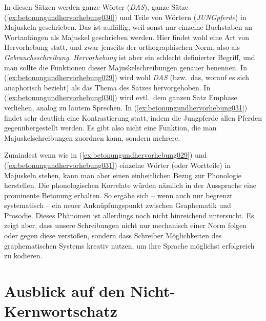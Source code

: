 In diesen Sätzen werden ganze Wörter (\textit{DAS}), ganze Sätze (\ref{ex:betonungundhervorhebung030}) und Teile von Wörtern (\textit{JUNGpferde}) in Majuskeln geschrieben.
Das ist auffällig, weil sonst nur einzelne Buchstaben an Wortanfängen als Majuskel geschrieben werden.
Hier findet wohl eine Art von Hervorhebung statt, und zwar jenseits der orthographischen Norm, also als \textit{Gebrauchsschreibung}.
\textit{Hervorhebung} ist aber ein schlecht definierter Begriff, und man sollte die Funktionen dieser Majuskelschreibungen genauer benennen.
In (\ref{ex:betonungundhervorhebung029}) wird wohl \textit{DAS} (bzw.\ das, worauf es sich anaphorisch bezieht) als das Thema des Satzes hervorgehoben.
In (\ref{ex:betonungundhervorhebung030}) wird evtl.\ dem ganzen Satz Emphase verliehen, analog zu lautem Sprechen.
In (\ref{ex:betonungundhervorhebung031}) findet sehr deutlich eine Kontrastierung statt, indem die Jungpferde allen Pferden gegenübergestellt werden.
Es gibt also nicht eine Funktion, die man Majuskelschreibungen zuordnen kann, sondern mehrere.

Zumindest wenn wie in (\ref{ex:betonungundhervorhebung029}) und (\ref{ex:betonungundhervorhebung031}) einzelne Wörter (oder Wortteile) in Majuskeln stehen, kann man aber einen einheitlichen Bezug zur Phonologie herstellen.
Die phonologischen Korrelate würden nämlich in der Aussprache eine prominente Betonung erhalten.
So ergäbe sich -- wenn auch nur begrenzt systematisch -- ein neuer Anknüpfungspunkt zwischen Graphematik und Prosodie.
Dieses Phänomen ist allerdings noch nicht hinreichend untersucht.
Es zeigt aber, dass unsere Schreibungen nicht nur mechanisch einer Norm folgen oder gegen diese verstoßen, sondern dass Schreiber Möglichkeiten des graphematischen Systems kreativ nutzen, um ihre Sprache möglichst erfolgreich zu kodieren.


\section{Ausblick auf den Nicht-Kernwortschatz}
\label{sec:ausblickaufdennichtkernwortschatz}


